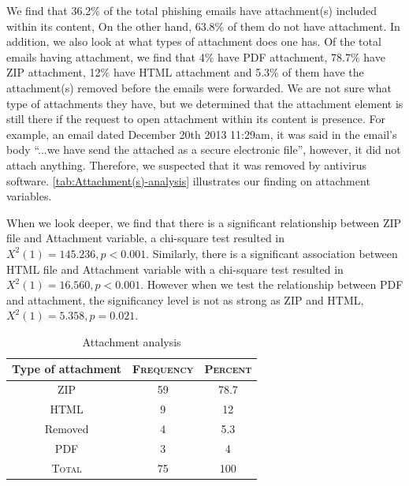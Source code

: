 We find that 36.2\% of the total phishing emails have attachment(s)
included within its content, On the other hand, 63.8\% of them do
not have attachment. In addition, we also look at what types of attachment
does one has. Of the total emails having attachment, we find that
4\% have PDF attachment, 78.7\% have ZIP attachment, 12\% have HTML
attachment and 5.3\% of them have the attachment(s) removed before
the emails were forwarded. We are not sure what type of attachments
they have, but we determined that the attachment element is still
there if the request to open attachment within its content is presence.
For example, an email dated December 20th 2013 11:29am, it was said
in the email's body ``...we have send the attached as a secure electronic
file'', however, it did not attach anything. Therefore, we suspected
that it was removed by antivirus software. \autoref{tab:Attachment(s)-analysis}
illustrates our finding on attachment variables. 

When we look deeper, we find that there is a significant relationship
between ZIP file and Attachment variable, a chi-square test resulted
in $X^{2}(1)=145.236,p<0.001$. Similarly, there is a significant
association between HTML file and Attachment variable with a chi-square
test resulted in $X^{2}(1)=16.560,p<0.001$. However when we test
the relationship between PDF and attachment, the significancy level
is not as strong as ZIP and HTML, $X^{2}(1)=5.358,p=0.021$.

\begin{table}[h]
\begin{centering}
\begin{tabular}{ccc}
\toprule 
Type of attachment & \textsc{Frequency} & \textsc{Percent}\tabularnewline
\midrule
\midrule 
{\footnotesize{}ZIP } & {\footnotesize{}59} & {\footnotesize{}78.7}\tabularnewline
\midrule 
{\footnotesize{}HTML } & {\footnotesize{}9} & {\footnotesize{}12}\tabularnewline
\midrule 
{\footnotesize{}Removed } & {\footnotesize{}4} & {\footnotesize{}5.3}\tabularnewline
\midrule 
{\footnotesize{}PDF} & {\footnotesize{}3} & {\footnotesize{}4}\tabularnewline
\midrule 
\textsc{\footnotesize{}Total} & {\footnotesize{}75} & {\footnotesize{}100}\tabularnewline
\bottomrule
\end{tabular}\protect\caption{\label{tab:Attachment(s)-analysis}Attachment analysis}

\par\end{centering}

%
%
\end{table}


